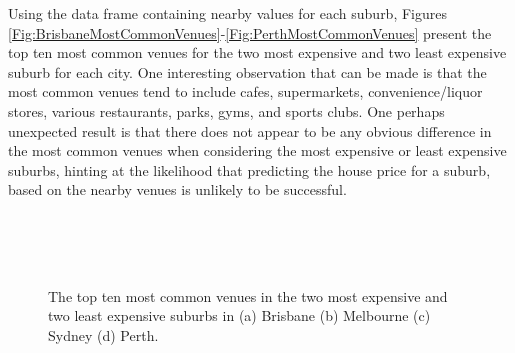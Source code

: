 \documentclass[12pt]{article}
\begin{document}
    \clearpage

    Using the data frame containing nearby values for each suburb, Figures \ref{Fig:BrisbaneMostCommonVenues}-\ref{Fig:PerthMostCommonVenues} present the top ten most common venues for the two most expensive and two least expensive suburb for each city. One interesting observation that can be made is that the most common venues tend to include cafes, supermarkets, convenience/liquor stores, various restaurants, parks, gyms, and sports clubs. One perhaps unexpected result is that there does not appear to be any obvious difference in the most common venues when considering the most expensive or least expensive suburbs, hinting at the likelihood that predicting the house price for a suburb, based on the nearby venues is unlikely to be successful.

    \begin{figure}[h!]
        \begin{center}
             \\
             \\
             \\
        \end{center}
        \caption{The top ten most common venues in the two most expensive and two least expensive suburbs in (a) Brisbane (b) Melbourne (c) Sydney (d) Perth.}
    \end{figure}
\end{document}
